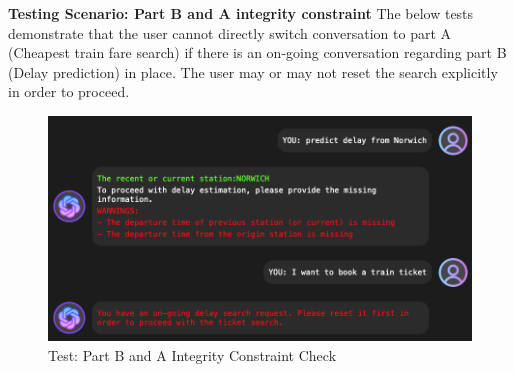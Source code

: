 \clearpage
\textbf{Testing Scenario: Part B and A integrity constraint}
The below tests demonstrate that the user cannot directly switch conversation to part A (Cheapest train fare search) if there is an on-going conversation regarding part B (Delay prediction) in place. The user may or may not reset the search explicitly in order to proceed.
\begin{figure} [!htbp]
    \centering
    \includegraphics[width=1\linewidth]{Diagrams/Group_work/testing_2.png}
    \caption{Test: Part B and A Integrity Constraint Check}
    \label{fig:test_2}
\end{figure}